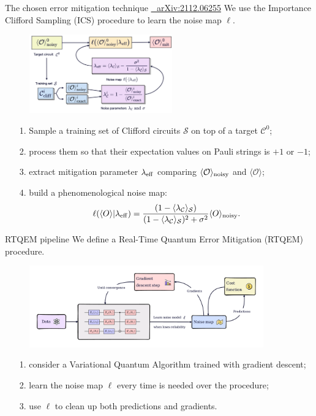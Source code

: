 \documentclass[8pt, xcolor={svgnames}, hyperref={linkcolor=black}, aspectratio=169]{beamer}
\begin{document}
\begin{frame}{The chosen error mitigation technique \hfill \href{https://arxiv.org/abs/2112.06255}{\faBook\,\, arXiv:2112.06255}}
\pause
We use the Importance Clifford Sampling (ICS) procedure to learn the noise map $\ell$.
\pause
\begin{figure}
    \includegraphics[width=0.55\textwidth]{figures/ics.png}
\end{figure}
\pause
\begin{itemize}[noitemsep]
\item[1.] Sample a training set of Clifford circuits $\mathcal{S}$ on top of a target $\mathcal{C}^0$;
\pause
\item[2.] process them so that their expectation values on Pauli strings is  $+1$ or $-1$;
\pause
\item[3.] extract mitigation parameter $\lambda_{\rm eff}$ comparing $\langle \mathcal{O}\rangle_{\rm noisy}$ and $\langle \mathcal{O}\rangle$;
\pause
\item[4.] build a phenomenological noise map:
$$ \ell(\langle O \rangle | \lambda_{\rm eff}) = \frac{(1 - \langle \lambda_{\mathcal{C}}
\rangle_{\mathcal{S}})}{(1 - \langle \lambda_{\mathcal{C}}\rangle_{\mathcal{S}})^2 
+ \sigma^2} \langle O \rangle_{\rm noisy}.$$
\end{itemize}
\end{frame}

\begin{frame}{RTQEM pipeline}
We define a Real-Time Quantum Error Mitigation (RTQEM) procedure.
\pause
\begin{figure}
    \includegraphics[width=0.9\textwidth]{figures/rtqem.pdf}
\end{figure}
\pause
\begin{itemize}[noitemsep]
\item[1.] consider a Variational Quantum Algorithm trained with gradient descent;
\pause
\item[2.] learn the noise map $\ell$ every time is needed over the procedure;
\pause
\item[3.] use $\ell$ to clean up both predictions and gradients.
\end{itemize}
\end{frame}
\end{document}
